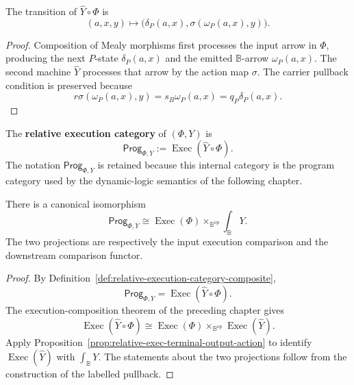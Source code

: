 \begin{proposition}
\label{prop:relative-evaluated-composite-transition}
The transition of \(\widehat Y\circ\Phi\) is
\[
    (a,x,y)
    \longmapsto
    \bigl(
        \delta_P(a,x),
        \sigma(\omega_P(a,x),y)
    \bigr).
\]
\end{proposition}

\begin{proof}
Composition of Mealy morphisms first processes the input arrow in \(\Phi\),
producing the next \(P\)-state \(\delta_P(a,x)\) and the emitted
\(\mathbb B\)-arrow \(\omega_P(a,x)\).  The second machine
\(\widehat Y\) processes that arrow by the action map \(\sigma\).  The carrier
pullback condition is preserved because
\[
    r\sigma(\omega_P(a,x),y)
    =s_B\omega_P(a,x)
    =q_P\delta_P(a,x).
\]
\end{proof}

\begin{definition}
\label{def:relative-execution-category-composite}
The \textbf{relative execution category} of \((\Phi,Y)\) is
\[
    \mathsf{Prog}_{\Phi,Y}
    :=
    \operatorname{Exec}(\widehat Y\circ\Phi).
\]
The notation \(\mathsf{Prog}_{\Phi,Y}\) is retained because this internal
category is the program category used by the dynamic-logic semantics of the
following chapter.
\end{definition}

\begin{theorem}
\label{thm:relative-execution-labelled-pullback}
There is a canonical isomorphism
\[
    \mathsf{Prog}_{\Phi,Y}
    \cong
    \operatorname{Exec}(\Phi)
    \times_{\mathbb B^{\mathrm{op}}}
    \int_{\mathbb B}Y.
\]
The two projections are respectively the input execution comparison and the
downstream comparison functor.
\end{theorem}

\begin{proof}
By Definition~\ref{def:relative-execution-category-composite},
\[
    \mathsf{Prog}_{\Phi,Y}
    =
    \operatorname{Exec}(\widehat Y\circ\Phi).
\]
The execution-composition theorem of the preceding chapter gives
\[
    \operatorname{Exec}(\widehat Y\circ\Phi)
    \cong
    \operatorname{Exec}(\Phi)
    \times_{\mathbb B^{\mathrm{op}}}
    \operatorname{Exec}(\widehat Y).
\]
Apply Proposition~\ref{prop:relative-exec-terminal-output-action} to identify
\(\operatorname{Exec}(\widehat Y)\) with \(\int_{\mathbb B}Y\).  The
statements about the two projections follow from the construction of the
labelled pullback.
\end{proof}

